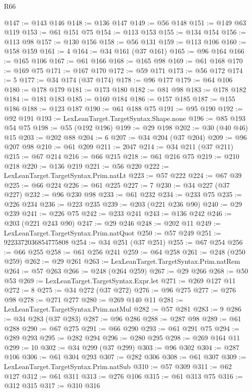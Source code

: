 \begin{lexlean}{R66}
\begin{coremodule}
@147 := @143 @146
@148 := @136 @147
@149 := @56 @148
@151 := @149 @63 @119
@153 := @61 @151 @75
@154 := @113 @153
@155 := @134 @154
@156 := @113 @98
@157 := @130 @156
@158 := @56 @131
@159 := @113 @106
@160 := @158 @159
@161 := 4
@164 := @34 @161 (@37 @161)
@165 := @96 @164
@166 := @165 @106
@167 := @61 @166
@168 := @165 @98
@169 := @61 @168
@170 := @169 @75
@171 := @167 @170
@172 := @59 @171
@173 := @56 @172
@174 := 5
@177 := @34 @174 (@37 @174)
@178 := @96 @177
@179 := @64 @106
@180 := @178 @179
@181 := @173 @180
@182 := @81 @98
@183 := @178 @182
@184 := @181 @183
@185 := @160 @184
@186 := @157 @185
@187 := @155 @186
@188 := @123 @187
@190 := @61 @188 @75
@191 := @95 @190
@192 := @92 @191
@193 := LexLeanTarget.TargetSyntax.Shape.none
@196 := @85 @193 @54 @75
@198 := @55 (@192 @196)
@199 := @29 @198
@202 := @30 (@40 @46) @15
@203 := @202 @88
@204 := 6
@207 := @34 @204 (@37 @204)
@209 := @96 @207 @98
@210 := @61 @209
@211 := 2047
@214 := @34 @211 (@37 @211)
@215 := @67 @214
@216 := @66 @215
@218 := @61 @216 @75
@219 := @210 @218
@220 := @136 @219
@221 := @56 @220
@222 := LexLeanTarget.TargetSyntax.Prim.natLt
@223 := @57 @222
@224 := @67 @39
@225 := @66 @224
@226 := @61 @225
@227 := 7
@230 := @34 @227 (@37 @227)
@232 := @96 @230 @98
@233 := @61 @232
@234 := @233 @75
@235 := @226 @234
@236 := @223 @235
@239 := @203 (@221 @236 @90)
@240 := @29 @239
@241 := @226 @75
@242 := @233 @241
@243 := @136 @242
@246 := @203 (@221 @243 @90)
@247 := @29 @246
@248 := @202 @11
@249 := LexLeanTarget.TargetSyntax.Prim.natQuot
@250 := @57 @249
@251 := 9223372036854775808
@254 := @34 @251 (@37 @251)
@255 := @67 @254
@256 := @66 @255
@258 := @61 @256 @241
@259 := @64 @258
@261 := @248 (@250 @259)
@262 := @29 @261
@263 := LexLeanTarget.TargetSyntax.Prim.natRem
@264 := @57 @263
@266 := @248 (@264 @259)
@267 := @29 @266
@268 := @50 @53
@269 := LexLeanTarget.TargetSyntax.Expr.let
@271 := @269 @127 @11
@272 := 8
@275 := @34 @272 (@37 @272)
@276 := @96 @275
@277 := @276 @98
@278 := @271 @277
@280 := @269 @140 @11
@281 := LexLeanTarget.TargetSyntax.Prim.natMul
@282 := @57 @281
@283 := 9
@286 := @34 @283 (@37 @283)
@287 := @96 @286
@288 := @287 @98
@289 := @61 @288
@290 := @67 @275
@291 := @66 @290
@293 := @61 @291 @75
@294 := @289 @293
@295 := @282 @294
@296 := @280 @295
@298 := @269 @164 @11
@299 := 10
@302 := @34 @299 (@37 @299)
@303 := @96 @302
@304 := @287 @106
@306 := @61 @304 @293
@307 := @282 @306
@308 := @61 @307
@309 := LexLeanTarget.TargetSyntax.Prim.natSub
@310 := @57 @309
@311 := @62 @127
@312 := @61 @311
@313 := @276 @106
@315 := @61 @313 @75
@316 := @312 @315
@317 := @310 @316

\end{coremodule}
\end{lexlean}
